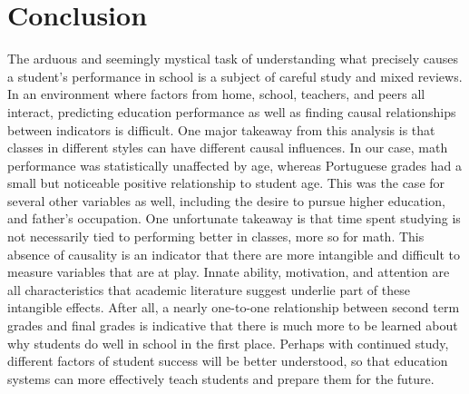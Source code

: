 \documentclass[12pt,english]{article}
\begin{document}
\section{Conclusion}\label{sec:conclusion}
The arduous and seemingly mystical task of understanding what precisely causes a student's performance in school is a subject of careful study and mixed reviews. In an environment where factors from home, school, teachers, and peers all interact, predicting education performance as well as finding causal relationships between indicators is difficult. One major takeaway from this analysis is that classes in different styles can have different causal influences. In our case, math performance was statistically unaffected by age, whereas Portuguese grades had a small but noticeable positive relationship to student age. This was the case for several other variables as well, including the desire to pursue higher education, and father's occupation. One unfortunate takeaway is that time spent studying is not necessarily tied to performing better in classes, more so for math. This absence of causality is an indicator that there are more intangible and difficult to measure variables that are at play. Innate ability, motivation, and attention are all characteristics that academic literature suggest underlie part of these intangible effects. After all, a nearly one-to-one relationship between second term grades and final grades is indicative that there is much more to be learned about why students do well in school in the first place. Perhaps with continued study, different factors of student success will be better understood, so that education systems can more effectively teach students and prepare them for the future.

\vfill
\pagebreak{}
\begin{spacing}{1.0}

\nocite{*}

\end{spacing}

\vfill
\pagebreak{}
\clearpage

\end{document}
